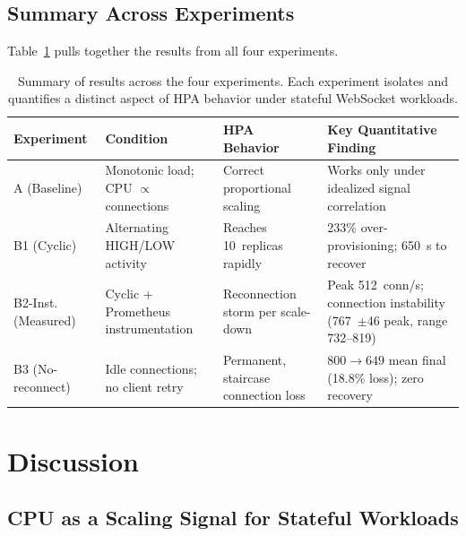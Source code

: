 \documentclass[twocolumn]{svjour3}
\begin{document}
\subsection{Summary Across Experiments}

Table~\ref{tab:failure_summary} pulls together the results from all four
experiments.

\begin{table}[t]
\centering
\caption{Summary of results across the four experiments. Each experiment isolates
and quantifies a distinct aspect of HPA behavior under stateful WebSocket workloads.}
\label{tab:failure_summary}
\begin{tabular}{@{}p{2.2cm}p{3.5cm}p{3.5cm}p{5cm}@{}}
\toprule
\rowcolor{gray!12}
\textbf{Experiment} & \textbf{Condition} & \textbf{HPA Behavior} & \textbf{Key Quantitative Finding} \\
\midrule
A (Baseline) & Monotonic load; CPU $\propto$ connections & Correct proportional scaling & Works only under idealized signal correlation \\
B1 (Cyclic) & Alternating HIGH/LOW activity & Reaches 10~replicas rapidly & 233\% over-provisioning; 650~s to recover \\
B2-Inst. (Measured) & Cyclic + Prometheus instrumentation & Reconnection storm per scale-down & Peak 512~conn/s; connection instability (767~$\pm$46 peak, range 732--819) \\
B3 (No-reconnect) & Idle connections; no client retry & Permanent, staircase connection loss & $800{\rightarrow}649$ mean final (18.8\% loss); zero recovery \\
\bottomrule
\end{tabular}
\end{table}



\section{Discussion}
\label{sec:discussion}

\subsection{CPU as a Scaling Signal for Stateful Workloads}
\label{sec:signal_mismatch}
\end{document}
